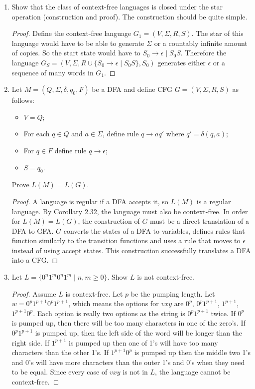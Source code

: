 \documentclass{article}
\begin{document}
\begin{enumerate}
        \item Show that the class of context-free languages is closed under the star operation (construction and proof). The construction should be quite simple.
            \begin{proof}
                Define the context-free language $G_1=(V, \Sigma, R, S)$. The star of this language would have to be able to generate $\Sigma$ or a countably infinite amount of copies. So the start state would have to $S_0\rightarrow \epsilon \mid S_0S$. Therefore the language $G_S=(V, \Sigma, R \cup \{S_0\rightarrow\epsilon\mid S_0S\}, S_0)$ generates either $\epsilon$ or a sequence of many words in $G_1$.
            \end{proof}
        \item Let $M=(Q,\Sigma, \delta, q_0, F)$ be a DFA and define CFG $G=(V,\Sigma,R,S)$ as follows:
            \begin{itemize}
                \item $V = Q$;
                \item For each $q\in Q$ and $ a\in \Sigma $, define rule $q\rightarrow aq'$ where $q'=\delta(q,a)$;
                \item For $q\in F$ define rule $q\rightarrow\epsilon$;
                \item $S=q_0$.
            \end{itemize}
            Prove $L(M) = L(G)$.
            \begin{proof}
                A language is regular if a DFA accepts it, so $L(M)$ is a regular language. By Corollary 2.32, the language must also be context-free. In order for $L(M) = L(G)$, the construction of $G$ must be a direct translation of a DFA to GFA. $G$ converts the states of a DFA to variables, defines rules that function similarly to the transition functions and uses a rule that moves to $\epsilon$ instead of using accept states. This construction successfully translates a DFA into a CFG.
            \end{proof}
        \item Let $L=\{0^n1^m0^n1^m \mid n,m \geq 0\}$. Show $L$ is not context-free.
            \begin{proof}
                Assume $L$ is context-free. Let $p$ be the pumping length. Let $w=0^p1^{p+1}0^p1^{p+1}$, which means the options for $vxy$ are $0^p$, $0^p1^{p+1}$, $1^{p+1}$, $1^{p+1}0^p$. Each option is really two options as the string is $0^p1^{p+1}$ twice. If $0^p$ is pumped up, then there will be too many characters in one of the zero's. If $0^p1^{p+1}$ is pumped up, then the left side of the word will be longer than the right side. If $1^{p+1}$ is pumped up then one of 1's will have too many characters than the other 1's. If $1^{p+1}0^p$ is pumped up then the middle two 1's and 0's will have more characters than the outer 1's and 0's when they need to be equal. Since every case of $vxy$ is not in $L$, the language cannot be context-free. 

\end{proof}
\end{enumerate}
\end{document}
